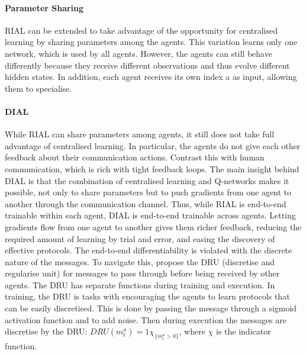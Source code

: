 \documentclass{article}
\begin{document}
\paragraph{Parameter Sharing} RIAL can be extended to take advantage of the opportunity for centralised learning by sharing parameters among the agents. This variation learns only one network, which is used by all agents. However, the agents can still behave differently because they receive different observations and thus evolve different hidden states. In addition, each agent receives its own index a as input, allowing them to specialise.


\paragraph{DIAL} While RIAL can share parameters among agents, it still does not take full advantage of centralised learning. In particular, the agents do not give each other feedback about their communication actions. Contrast this with human communication, which is rich with tight feedback loops. The main insight behind DIAL is that the combination of centralised learning and Q-networks makes it possible, not only to share parameters but to push gradients from one agent to another through the communication channel. Thus, while RIAL is end-to-end trainable within each agent, DIAL is end-to-end trainable across agents. Letting gradients flow from one agent to another gives them richer feedback, reducing the required amount of learning by trial and error, and easing the discovery of effective protocols. The end-to-end differentiability is violated with the discrete nature of the messages. To navigate this, \citet{foerster2016learning} propose the DRU (discretise and regularise unit) for messages to pass through before being received by other agents. The DRU has separate functions during training and execution. In training, the DRU is tasks with encouraging the agents to learn protocols that can be easily discretised. This is done by passing the message through a sigmoid activation function and to add noise. Then during execution the messages are discretise by the DRU: $DRU(m_t^a) = 1\chi_{\{ m_t^a > 0 \}}$, where $\chi$ is the indicator function.
\end{document}
